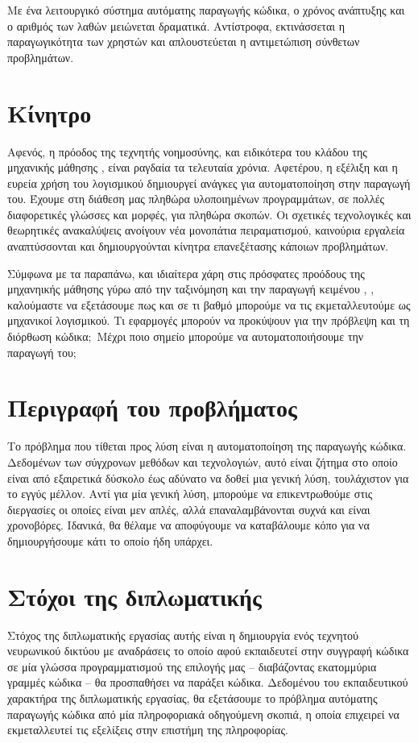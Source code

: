 Με ένα λειτουργικό σύστημα αυτόματης παραγωγής κώδικα, ο χρόνος ανάπτυξης και ο αριθμός των λαθών μειώνεται δραματικά. 
Αντίστροφα, εκτινάσσεται η παραγωγικότητα των χρηστών και απλουστεύεται η αντιμετώπιση σύνθετων προβλημάτων.

\section{Κίνητρο}
Αφενός, η πρόοδος της τεχνητής νοημοσύνης, και ειδικότερα του κλάδου της μηχανικής μάθησης , είναι ραγδαία τα τελευταία χρόνια.
Αφετέρου, η εξέλιξη και η ευρεία χρήση του λογισμικού δημιουργεί ανάγκες για αυτοματοποίηση στην παραγωγή του.
Έχουμε στη διάθεση μας πληθώρα υλοποιημένων προγραμμάτων, σε πολλές διαφορετικές γλώσσες και μορφές, για πληθώρα σκοπών.
Οι σχετικές τεχνολογικές και θεωρητικές ανακαλύψεις ανοίγουν νέα μονοπάτια πειραματισμού, καινούρια εργαλεία αναπτύσσονται και δημιουργούνται κίνητρα επανεξέτασης κάποιων προβλημάτων.

Σύμφωνα με τα παραπάνω, και ιδιαίτερα χάρη στις πρόσφατες προόδους της μηχανηικής μάθησης γύρω από την ταξινόμηση και την παραγωγή κειμένου \cite{Graves2013}, \cite{Liu2016}, καλούμαστε να εξετάσουμε πως και σε τι βαθμό μπορούμε να τις εκμεταλλευτούμε ως μηχανικοί λογισμικού. Τι εφαρμογές μπορούν να προκύψουν για την πρόβλεψη και τη διόρθωση κώδικα$;$ Μέχρι ποιο σημείο μπορούμε να αυτοματοποιήσουμε την παραγωγή του$;$

\section{Περιγραφή του προβλήματος}
Το πρόβλημα που τίθεται προς λύση είναι η αυτοματοποίηση της παραγωγής κώδικα. 
Δεδομένων των σύγχρονων μεθόδων και τεχνολογιών, αυτό είναι ζήτημα στο οποίο είναι από εξαιρετικά δύσκολο έως αδύνατο να δοθεί μια γενική λύση, τουλάχιστον για το εγγύς μέλλον.
Αντί για μία γενική λύση, μπορούμε να επικεντρωθούμε στις διεργασίες οι οποίες είναι μεν απλές, αλλά επαναλαμβάνονται συχνά και είναι χρονοβόρες.
Ιδανικά, θα θέλαμε να αποφύγουμε να καταβάλουμε κόπο για να δημιουργήσουμε κάτι το οποίο ήδη υπάρχει. 

\section{Στόχοι της διπλωματικής}

Στόχος της διπλωματικής εργασίας αυτής είναι η δημιουργία ενός τεχνητού νευρωνικού δικτύου με αναδράσεις  το οποίο αφού εκπαιδευτεί στην συγγραφή κώδικα σε μία γλώσσα προγραμματισμού της επιλογής μας -- διαβάζοντας εκατομμύρια γραμμές κώδικα -- θα προσπαθήσει να παράξει κώδικα. Δεδομένου του εκπαιδευτικού χαρακτήρα της διπλωματικής εργασίας, θα εξετάσουμε το πρόβλημα αυτόματης παραγωγής κώδικα από μία πληροφοριακά οδηγούμενη  σκοπιά, η οποία επιχειρεί να εκμεταλλευτεί τις εξελίξεις στην επιστήμη της πληροφορίας.

